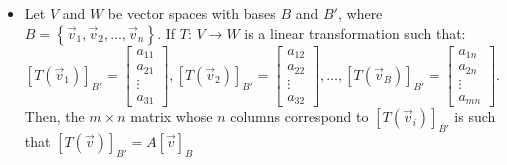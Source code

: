 \documentclass[12pt]{article}
\begin{document}
\begin{itemize}
  \item Let $V$ and $W$ be vector spaces with bases $B$ and $B'$, where $B=\left\{ \overrightarrow{v}_1,\overrightarrow{v}_2,\dots,\overrightarrow{v}_n \right\}$. If $T:\,V\rightarrow W$ is a linear transformation such that:\newline $[T(\overrightarrow{v}_1)]_{B'}=\begin{bmatrix} a_{11}\\a_{21}\\\vdots\\a_{31}\end{bmatrix},[T(\overrightarrow{v}_2)]_{B'}=\begin{bmatrix} a_{12}\\a_{22}\\\vdots\\a_{32}\end{bmatrix},\dots,[T(\overrightarrow{v}_B)]_{B'}=\begin{bmatrix}a_{1n}\\a_{2n}\\\vdots\\a_{mn}\end{bmatrix}$. Then, the $m\times n$ matrix whose $n$ columns correspond to $[T(\overrightarrow{v}_i)]_{B'}$ is such that $[T(\overrightarrow{v})]_{B'}=A[\overrightarrow{v}]_B$

\end{itemize}
\end{document}
